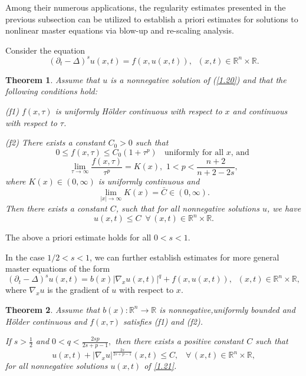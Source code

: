 \documentclass[12pt]{article}
\newtheorem{mthm}{Theorem}
\theoremstyle{remark}
\numberwithin{equation}{section}
\begin{document}
\medskip

Among their numerous applications, the regularity estimates presented in the previous subsection can be utilized to establish a priori estimates for solutions to nonlinear master equations via blow-up and re-scaling analysis.

Consider the equation
\begin{equation}
(\partial_t - \Delta)^s u(x,t) = f(x, u(x,t)), \;\; (x,t) \in \mathbb{R}^n \times \mathbb{R}.
\label{1.20}
\end{equation}

\begin{mthm} \label{mthm7}
Assume that $u$ is a nonnegative solution of (\ref{1.20}) and that the following conditions hold:

(f1) $f(x, \tau)$ is uniformly H\"{o}lder continuous with respect to $x$ and continuous  with respect to $\tau$.

 (f2) There exists a constant $C_0 > 0$ such that
 $$0\leq f(x, \tau) \leq C_0(1+\tau^p) \;\;  \mbox{   uniformly for all $x$, and }$$
 $$
 \mathop{\lim}\limits_{\tau \to \infty}\frac{f(x, \tau)}{\tau^p}=K(x), \,\, 1< p < \frac{n+2}{n+2-2s},
 $$
 where $K(x)\in (0, \infty)$ is uniformly continuous and
 $$ \mathop{\lim}\limits_{|x|\to \infty} K(x)=\bar C\in (0, \infty).$$
 Then there exists a constant $C$, such that  for all nonnegative solutions $u$, we have
 $$
 u(x,t) \leq C \,\,\, \forall \, (x,t) \in \mathbb{R}^n \times \mathbb{R}.
 $$

 \end{mthm}
 The above a priori estimate holds for all $0<s<1$.

 In the case $1/2 <s <1$, we can further establish estimates for more general master equations of the form
 \begin{equation} \label{1.21}
 (\partial_t - \Delta)^s u(x,t) = b(x)|\nabla_x u(x,t)|^q + f(x, u(x,t)), \;\; (x,t) \in \mathbb{R}^n \times \mathbb{R},
 \end{equation}
where $\nabla_x u$ is the gradient of $u$ with respect to $x$.


\begin{mthm} \label{mthm8} Assume that
  $b(x):  \mathbb{R}^n \to \mathbb{R}$  is nonnegative,uniformly bounded and  H\"{o}lder continuous and $f(x, \tau)$ satisfies (f1) and (f2).

If $s>\frac{1}{2}$ and $0<q<\frac{2sp}{2s+p-1},$ then there exists a positive constant $C$ such that
$$
u(x,t)+|\nabla_x u|^{\frac{2s}{2s+p-1}}(x,t)\leq C,  \;\;\; \forall \, (x,t) \in \mathbb{R}^n \times \mathbb{R},
$$
for all nonnegative solutions $u(x,t)$ of \eqref{1.21}.
\end{mthm}
\medskip
\end{document}
